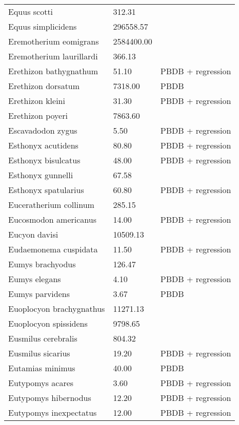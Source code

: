 \begin{longtable}{p{} p{} p{}}
    Equus scotti & 312.31 & \cite{Smith2004} \\ 
    Equus simplicidens & 296558.57 & \cite{Tomiya2013} \\ 
    Eremotherium eomigrans & 2584400.00 & \cite{McDonald1995} \\ 
    Eremotherium laurillardi & 366.13 & \cite{Smith2004} \\ 
    Erethizon bathygnathum & 51.10 & PBDB + regression \\ 
    Erethizon dorsatum & 7318.00 & PBDB \\ 
    Erethizon kleini & 31.30 & PBDB + regression \\ 
    Erethizon poyeri & 7863.60 & \cite{Tomiya2013} \\ 
    Escavadodon zygus & 5.50 & PBDB + regression \\ 
    Esthonyx acutidens & 80.80 & PBDB + regression \\ 
    Esthonyx bisulcatus & 48.00 & PBDB + regression \\ 
    Esthonyx gunnelli & 67.58 & \cite{Korth2010} \\ 
    Esthonyx spatularius & 60.80 & PBDB + regression \\ 
    Euceratherium collinum & 285.15 & \cite{Smith2004} \\ 
    Eucosmodon americanus & 14.00 & PBDB + regression \\ 
    Eucyon davisi & 10509.13 & \cite{Tomiya2013} \\ 
    Eudaemonema cuspidata & 11.50 & PBDB + regression \\ 
    Eumys brachyodus & 126.47 & \cite{Tomiya2013} \\ 
    Eumys elegans & 4.10 & PBDB + regression \\ 
    Eumys parvidens & 3.67 & PBDB \\ 
    Euoplocyon brachygnathus & 11271.13 & \cite{Tomiya2013} \\ 
    Euoplocyon spissidens & 9798.65 & \cite{Tomiya2013} \\ 
    Eusmilus cerebralis & 804.32 & \cite{Tomiya2013} \\ 
    Eusmilus sicarius & 19.20 & PBDB + regression \\ 
    Eutamias minimus & 40.00 & PBDB \\ 
    Eutypomys acares & 3.60 & PBDB + regression \\ 
    Eutypomys hibernodus & 12.20 & PBDB + regression \\ 
    Eutypomys inexpectatus & 12.00 & PBDB + regression \\ 

\end{longtable}
